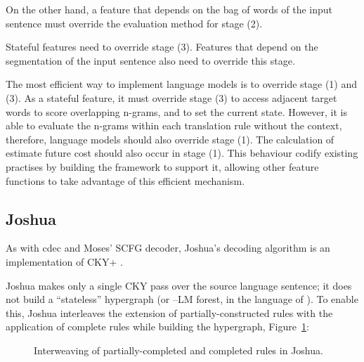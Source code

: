 \documentclass{pbml}
\begin{document}
On the other hand, a feature that depends on the bag of words of the input sentence must override the evaluation method for stage (2).

Stateful features need to override stage (3). Features that depend on the segmentation of the input sentence also need to override this stage. 

The most efficient way to implement language models is to override stage (1) and (3). As a stateful feature, it must override stage (3) to access adjacent target words to score overlapping n-grams, and to set the current state. However, it is able to evaluate the n-grams within each translation rule without the context, therefore, language models should also override stage (1). The calculation of estimate future cost should also occur in stage (1). This behaviour codify existing practises by building the framework to support it, allowing other feature functions to take advantage of this efficient mechanism.

\subsection{Joshua}

As with cdec and Moses' SCFG decoder, Joshua's decoding algorithm is an implementation of CKY+ \cite{chappelier1998generalized}. 

Joshua makes only a single CKY pass over the source language sentence; it does not build a
``stateless'' hypergraph (or --LM forest, in the language of \citet{chiang2007hierarchical}). To
enable this, Joshua interleaves the extension of partially-constructed rules with the application of
complete rules while building the hypergraph, Figure~\ref{algorithm:joshua}:

\begin{figure} [h!]
\small 
\begin{algorithmic}
    \ENDFOR
  \ENDFOR
\end{algorithmic}
\caption{Interweaving of partially-completed and completed rules in Joshua.}
\label{algorithm:joshua}
\end{figure} 
\end{document}
